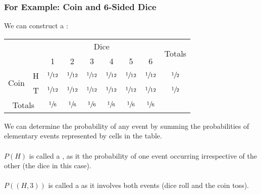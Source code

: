 \documentclass{report}
\begin{document}
\subsubsection*{For Example: Coin and 6-Sided Dice}
We can construct a :
\begin{center}
	\begin{tabular}{c c c c c c c c c}
		\setlength{\tabcolsep}{3em}
		                           &                & \multicolumn{6}{c}{Dice} & \multirow{2}{*}{Totals}                                                                                          \\
		                           &                & 1                        & 2                       & 3               & 4               & 5               & 6                                \\
		\multirow{2}{*}{Coin}      & H              & $\sfrac{1}{12}$          & $\sfrac{1}{12}$         & $\sfrac{1}{12}$ & $\sfrac{1}{12}$ & $\sfrac{1}{12}$ & $\sfrac{1}{12}$ & $\sfrac{1}{2}$ \\
		                           & T              & $\sfrac{1}{12}$          & $\sfrac{1}{12}$         & $\sfrac{1}{12}$ & $\sfrac{1}{12}$ & $\sfrac{1}{12}$ & $\sfrac{1}{12}$ & $\sfrac{1}{2}$ \\
		\multicolumn{2}{c}{Totals} & $\sfrac{1}{6}$ & $\sfrac{1}{6}$           & $\sfrac{1}{6}$          & $\sfrac{1}{6}$  & $\sfrac{1}{6}$  & $\sfrac{1}{6}$  &                                  \\
	\end{tabular}
\end{center}
We can determine the probability of any event by summing the probabilities of elementary events represented by cells in the table.
\\
\\ $P({H})$ is called a , as it the probability of one event occurring irrespective of the other (the dice in this case).
\\
\\ $P({(H,3)})$ is called a  as it involves both events (dice roll and the coin toss).
\end{document}
